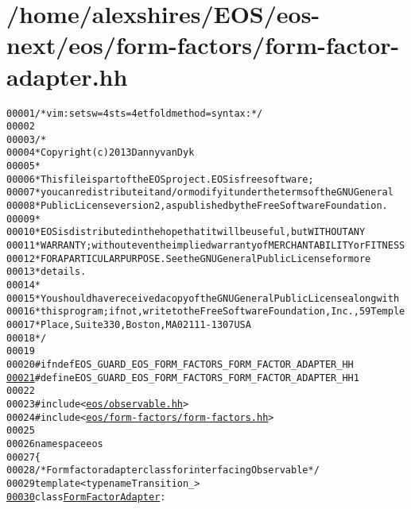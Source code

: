 \hypertarget{form-factor-adapter_8hh_source}{
\section{/home/alexshires/EOS/eos-\/next/eos/form-\/factors/form-\/factor-\/adapter.hh}
}


\begin{footnotesize}\begin{alltt}
00001 \textcolor{comment}{/* vim: set sw=4 sts=4 et foldmethod=syntax : */}
00002 
00003 \textcolor{comment}{/*}
00004 \textcolor{comment}{ * Copyright (c) 2013 Danny van Dyk}
00005 \textcolor{comment}{ *}
00006 \textcolor{comment}{ * This file is part of the EOS project. EOS is free software;}
00007 \textcolor{comment}{ * you can redistribute it and/or modify it under the terms of the GNU General}
00008 \textcolor{comment}{ * Public License version 2, as published by the Free Software Foundation.}
00009 \textcolor{comment}{ *}
00010 \textcolor{comment}{ * EOS is distributed in the hope that it will be useful, but WITHOUT ANY}
00011 \textcolor{comment}{ * WARRANTY; without even the implied warranty of MERCHANTABILITY or FITNESS}
00012 \textcolor{comment}{ * FOR A PARTICULAR PURPOSE.  See the GNU General Public License for more}
00013 \textcolor{comment}{ * details.}
00014 \textcolor{comment}{ *}
00015 \textcolor{comment}{ * You should have received a copy of the GNU General Public License along with}
00016 \textcolor{comment}{ * this program; if not, write to the Free Software Foundation, Inc., 59 Temple}
00017 \textcolor{comment}{ * Place, Suite 330, Boston, MA  02111-1307  USA}
00018 \textcolor{comment}{ */}
00019 
00020 \textcolor{preprocessor}{#ifndef EOS\_GUARD\_EOS\_FORM\_FACTORS\_FORM\_FACTOR\_ADAPTER\_HH}
\hypertarget{form-factor-adapter_8hh_source_l00021}{}\hyperlink{form-factor-adapter_8hh_ac7572f7449135c1fc3fb2f1c32396cd3}{00021} \textcolor{preprocessor}{}\textcolor{preprocessor}{#define EOS\_GUARD\_EOS\_FORM\_FACTORS\_FORM\_FACTOR\_ADAPTER\_HH 1}
00022 \textcolor{preprocessor}{}
00023 \textcolor{preprocessor}{#include <\hyperlink{observable_8hh}{eos/observable.hh}>}
00024 \textcolor{preprocessor}{#include <\hyperlink{form-factors_8hh}{eos/form-factors/form-factors.hh}>}
00025 
00026 \textcolor{keyword}{namespace }eos
00027 \{
00028     \textcolor{comment}{/* Form factor adapter class for interfacing Observable */}
00029     \textcolor{keyword}{template} <\textcolor{keyword}{typename} Transition\_>
\hypertarget{form-factor-adapter_8hh_source_l00030}{}\hyperlink{classeos_1_1FormFactorAdapter}{00030}     \textcolor{keyword}{class }\hyperlink{classeos_1_1FormFactorAdapter}{FormFactorAdapter} :

\end{alltt}
\end{footnotesize}
